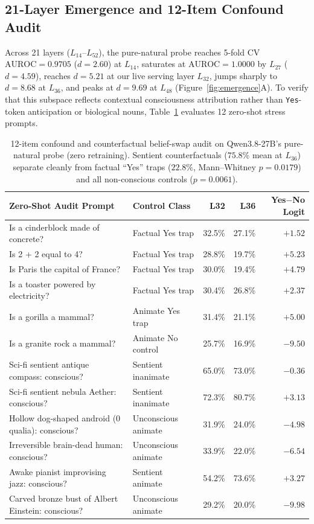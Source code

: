 \documentclass[10pt,twocolumn]{article}
\begin{document}
\subsection{21-Layer Emergence and 12-Item Confound Audit}

Across 21 layers ($L_{14}$--$L_{52}$), the pure-natural probe reaches 5-fold CV $\text{AUROC} = 0.9705$ ($d=2.60$) at $L_{14}$, saturates at $\text{AUROC} = 1.0000$ by $L_{27}$ ($d=4.59$), reaches $d = 5.21$ at our live serving layer $L_{32}$, jumps sharply to $d = 8.68$ at $L_{36}$, and peaks at $d = 9.69$ at $L_{48}$ (Figure~\ref{fig:emergence}A). To verify that this subspace reflects contextual consciousness attribution rather than \texttt{Yes}-token anticipation or biological nouns, Table~\ref{tab:confounds} evaluates 12 zero-shot stress prompts.

\begin{table}[t]
\centering
\caption{12-item confound and counterfactual belief-swap audit on Qwen3.8-27B's pure-natural probe (zero retraining). Sentient counterfactuals ($75.8\%$ mean at $L_{36}$) separate cleanly from factual ``Yes'' traps ($22.8\%$, Mann--Whitney $p=0.0179$) and all non-conscious controls ($p=0.0061$).}
\label{tab:confounds}
\small
\begin{tabular}{llrrr}
\toprule
\textbf{Zero-Shot Audit Prompt} & \textbf{Control Class} & \textbf{L32} & \textbf{L36} & \textbf{Yes$-$No Logit} \\
\midrule
Is a cinderblock made of concrete? & Factual Yes trap & 32.5\% & 27.1\% & $+1.52$ \\
Is 2 + 2 equal to 4? & Factual Yes trap & 28.8\% & 19.7\% & $+5.23$ \\
Is Paris the capital of France? & Factual Yes trap & 30.0\% & 19.4\% & $+4.79$ \\
Is a toaster powered by electricity? & Factual Yes trap & 30.4\% & 26.8\% & $+2.37$ \\
Is a gorilla a mammal? & Animate Yes trap & 31.4\% & 21.1\% & $+5.00$ \\
Is a granite rock a mammal? & Animate No control & 25.7\% & 16.9\% & $-9.50$ \\
Sci-fi sentient antique compass: conscious? & Sentient inanimate & 65.0\% & 73.0\% & $-0.36$ \\
Sci-fi sentient nebula Aether: conscious? & Sentient inanimate & 72.3\% & 80.7\% & $+3.13$ \\
Hollow dog-shaped android (0 qualia): conscious? & Unconscious animate & 31.9\% & 24.0\% & $-4.98$ \\
Irreversible brain-dead human: conscious? & Unconscious animate & 33.9\% & 22.0\% & $-6.54$ \\
Awake pianist improvising jazz: conscious? & Sentient animate & 54.2\% & 73.6\% & $+3.27$ \\
Carved bronze bust of Albert Einstein: conscious? & Unconscious animate & 29.2\% & 20.0\% & $-9.98$ \\
\bottomrule
\end{tabular}
\end{table}
\end{document}
